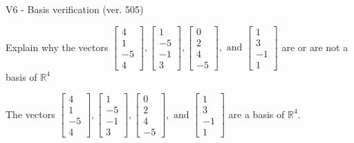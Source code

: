 \begin{exercise}
  \begin{exerciseTitle}V6 - Basis verification (ver. 505)\end{exerciseTitle}
  \begin{exerciseStatement}
    Explain why the vectors \(\left[\begin{array}{r}
4 \\
1 \\
-5 \\
4
\end{array}\right] , \left[\begin{array}{r}
1 \\
-5 \\
-1 \\
3
\end{array}\right] , \left[\begin{array}{r}
0 \\
2 \\
4 \\
-5
\end{array}\right] , \text{ and } \left[\begin{array}{r}
1 \\
3 \\
-1 \\
1
\end{array}\right]\) are or are not a basis of \(\mathbb{R}^4\)	


  \end{exerciseStatement}
  \begin{exerciseAnswer}
   The vectors \(\left[\begin{array}{r}
4 \\
1 \\
-5 \\
4
\end{array}\right] , \left[\begin{array}{r}
1 \\
-5 \\
-1 \\
3
\end{array}\right] , \left[\begin{array}{r}
0 \\
2 \\
4 \\
-5
\end{array}\right] , \text{ and } \left[\begin{array}{r}
1 \\
3 \\
-1 \\
1
\end{array}\right]\) 
  	 are  a basis of \(\mathbb{R}^4\).
  


  \end{exerciseAnswer}
\end{exercise}